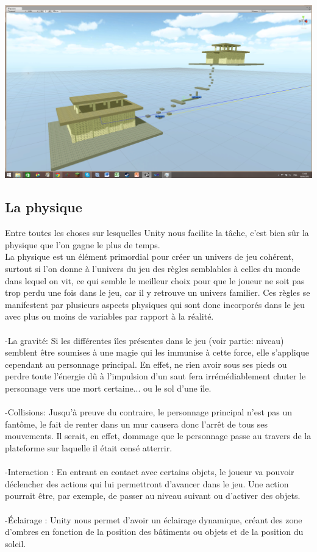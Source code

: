 \documentclass[a4paper]{article}
\begin{document}
\includegraphics[width=1.1\textwidth]{parcour_lvl1_V1.png}


\pagebreak

\subsection{La physique}
\vspace{0.5 cm}

Entre toutes les choses sur lesquelles Unity nous facilite la tâche, c'est bien sûr la physique que l'on gagne le plus de temps.\\
La physique est un élément primordial pour créer un univers de jeu cohérent, surtout si l'on donne à l'univers du jeu des règles semblables à celles du monde dans lequel on vit, ce qui semble le meilleur choix pour que le joueur ne soit pas trop perdu une fois dans le jeu, car il y retrouve un univers familier.
Ces \og règles \fg {} se manifestent par plusieurs aspects physiques qui sont donc incorporés dans le jeu avec plus ou moins de variables par rapport à la réalité.\\
\\
-La gravité: Si les différentes îles présentes dans le jeu (voir partie: niveau) semblent être soumises à une magie qui les immunise à cette force, elle s'applique cependant au personnage principal. En effet, ne rien avoir sous ses pieds ou perdre toute l’énergie dû à l'impulsion d'un saut fera irrémédiablement chuter le personnage vers une mort certaine... ou le sol d'une île.\\
\\
-Collisions: Jusqu’à preuve du contraire, le personnage principal n'est pas un fantôme, le fait de renter dans un mur causera donc l'arrêt de tous ses mouvements. Il serait, en effet,  dommage que le personnage passe au travers de la plateforme sur laquelle il était censé atterrir.\\
\\
-Interaction : En entrant en contact avec certains objets, le joueur va pouvoir déclencher des actions qui lui permettront d'avancer dans le jeu. Une action pourrait être, par exemple, de passer au niveau suivant ou d'activer des objets.\\
\\
-Éclairage : Unity nous permet d'avoir un éclairage dynamique, créant des zone d'ombres en fonction de la position des bâtiments ou objets et de la position du soleil.
\end{document}
